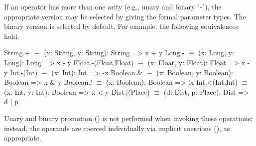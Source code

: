 If an operator has more than one arity (e.g., unary and binary
\xcd"-"), the appropriate version may be selected by giving the
formal parameter types.  The binary version is selected by
default.
For example, the following equivalences hold:

\begin{xtenmath}
String.+             $\equiv$ (x: String, y: String): String => x + y
Long.-               $\equiv$ (x: Long, y: Long): Long => x - y
Float.-(Float,Float) $\equiv$ (x: Float, y: Float): Float => x - y
Int.-(Int)           $\equiv$ (x: Int): Int => -x
Boolean.&            $\equiv$ (x: Boolean, y: Boolean): Boolean => x & y
Boolean.!            $\equiv$ (x: Boolean): Boolean => !x
Int.<(Int,Int)       $\equiv$ (x: Int, y: Int): Boolean => x < y
Dist.|(Place)        $\equiv$ (d: Dist, p: Place): Dist => d | p
\end{xtenmath}



%

Unary and binary promotion () is not performed
when invoking these
operations; instead, the operands are coerced individually via implicit
coercions (), as appropriate.


